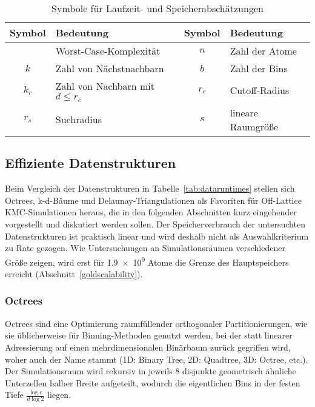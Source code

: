 \begin{table}[h]
  \vspace{1em}

  \oddrowcolors
  \caption{Symbole für Laufzeit- und Speicherabschätzungen}
  \label{tab:datasymbols}
  \begin{tabularx}{\textwidth}{|cX|cX|}
    \hline
    \textbf{Symbol} & \textbf{Bedeutung}                 & \textbf{Symbol} & \textbf{Bedeutung} \\
    \hline
    \BigO{}         & Worst-Case-Komplexität             & $n$             & Zahl der Atome     \\
    $k$             & Zahl von Nächstnachbarn            & $b$             & Zahl der Bins      \\
    $k_r$           & Zahl von Nachbarn mit $d \leq r_c$ & $r_c$           & Cutoff-Radius      \\
    $r_s$           & Suchradius                         & $s$             & lineare Raumgröße  \\
    \hline
  \end{tabularx}

\end{table}

\clearpage
\subsection{Effiziente Datenstrukturen}

Beim Vergleich der Datenstrukturen in Tabelle~\ref{tab:dataruntimes} stellen sich Octrees, k-d-Bäume und Delaunay-Triangulationen als Favoriten für Off-Lattice KMC-Simulationen heraus, die in den folgenden Abschnitten kurz eingehender vorgestellt und diskutiert werden sollen.
Der Speicherverbrauch der untersuchten Datenstrukturen ist praktisch linear und wird deshalb nicht als Auswahlkriterium zu Rate gezogen.
Wie Untersuchungen an Simulationsräumen verschiedener Größe zeigen, wird erst für \num{1.9e9} Atome die Grenze des Hauptspeichers erreicht (Abschnitt~\ref{goldscalability}).

\subsubsection{Octrees}
\label{dataoctree}

Octrees sind eine Optimierung raumfüllender orthogonaler Partitionierungen, wie sie üblicherweise für Binning-Methoden genutzt werden, bei der statt linearer Adressierung auf einen mehrdimensionalen Binärbaum zurück gegriffen wird, woher auch der Name stammt (1D: Binary Tree, 2D: Quadtree, 3D: Octree, etc.).
Der Simulationsraum wird rekursiv in jeweils 8 disjunkte geometrisch ähnliche Unterzellen halber Breite aufgeteilt, wodurch die eigentlichen Bins in der festen Tiefe $\frac{\log{c}}{d\log{2}}$ liegen.

